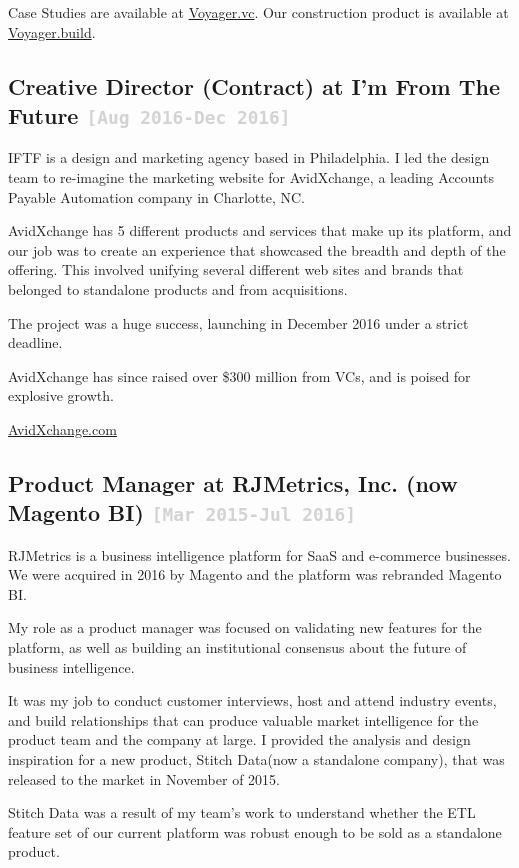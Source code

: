 \documentclass{tufte-handout}
\newcommand{\shstandout}[1]{\textbf{\textcolor{BurntOrange}{#1}}}
\newcommand{\shyears}[1]{\small{\texttt{\textcolor{LightGray}{#1}}}}
\begin{document}
Case Studies are available at \href{http://www.Voyager.vc}{Voyager.vc}.
Our construction product is available at \href{http://www.Voyager.build}{Voyager.build}.


\subsection{\textbf{Creative Director (Contract)} at \shstandout{I'm From The Future} \shyears{[Aug 2016-Dec 2016]}}

IFTF is a design and marketing agency based in Philadelphia. I led the design team to re-imagine the marketing website for AvidXchange, a leading Accounts Payable Automation company in Charlotte, NC.

AvidXchange has 5 different products and services that make up its platform, and our job was to create an experience that showcased the breadth and depth of the offering. This involved unifying several different web sites and brands that belonged to standalone products and from acquisitions.

The project was a huge success, launching in December 2016 under a strict deadline.

AvidXchange has since raised over \$300 million from VCs, and is poised for explosive growth.

\href{https://www.AvidXchange.com}{AvidXchange.com}

\subsection{\textbf{Product Manager} at \shstandout{RJMetrics, Inc. (now Magento BI)} \shyears{[Mar 2015-Jul 2016]}}

RJMetrics is a business intelligence platform for SaaS and e-commerce businesses. We were acquired in 2016 by Magento and the platform was rebranded  Magento BI.

My role as a product manager was focused on validating new features for the platform, as well as building an institutional consensus about the future of business intelligence.

It was my job to conduct customer interviews, host and attend industry events, and build relationships that can produce valuable market intelligence for the product team and the company at large. I provided the analysis and design inspiration for a new product, Stitch Data(now a standalone company), that was released to the market in November of 2015.

Stitch Data was a result of my team's work to understand whether the ETL feature set of our current platform was robust enough to be sold as a standalone product.
\end{document}
